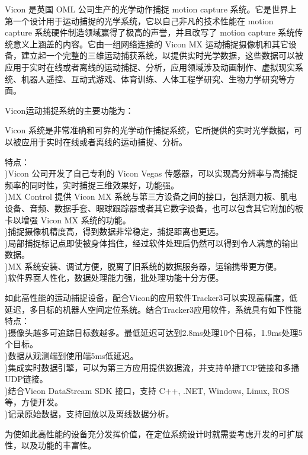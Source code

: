 Vicon 是英国 OML 公司生产的光学动作捕捉 motion capture 系统。它是世界上第一个设计用于运动捕捉的光学系统，它以自己非凡的技术性能在 motion capture 系统硬件制造领域赢得了极高的声誉，并且改写了 motion capture 系统传统意义上涵盖的内容。它由一组网络连接的 Vicon MX 运动捕捉摄像机和其它设备，建立起一个完整的三维运动捕获系统，以提供实时光学数据，这些数据可以被应用于实时在线或者离线的运动捕捉、分析，应用领域涉及动画制作、虚拟现实系统、机器人遥控、互动式游戏、体育训练、人体工程学研究、生物力学研究等方面。

Vicon运动捕捉系统的主要功能为：

Vicon 系统是非常准确和可靠的光学动作捕捉系统，它所提供的实时光学数据，可以被应用于实时在线或者离线的运动捕捉、分析。

特点：\\
)Vicon 公司开发了自己专利的 Vicon Vegas 传感器，可以实现高分辨率与高捕捉频率的同时性，实时捕捉三维效果好，功能强。\\
)MX Control 提供 Vicon MX 系统与第三方设备之间的接口，包括测力板、肌电设备、音频、数据手套、眼球跟踪器或者其它数字设备，也可以包含其它附加的板卡以增强 Vicon MX 系统的功能。\\
)捕捉摄像机精度高，得到数据非常稳定，捕捉距离也更远。\\
)局部捕捉标记点即使被身体挡住，经过软件处理后仍然可以得到令人满意的输出数据。\\
)MX 系统安装、调试方便，脱离了旧系统的数据服务器，运输携带更方便。\\
)软件界面人性化，数据处理能力强，批处理功能十分方便。

如此高性能的运动捕捉设备，配合Vicon的应用软件Tracker3可以实现高精度，低延迟，多目标的机器人空间定位系统。结合Tracker3应用软件，系统具有如下性能特点：\\
)摄像头越多可追踪目标数越多。最低延迟可达到2.8ms处理10个目标，1.9ms处理5个目标。\\
)数据从观测端到使用端5ms低延迟。\\
)集成实时数据引擎，可以为第三方应用提供数据流，并支持单播TCP链接和多播UDP链接。\\
)结合Vicon DataStream SDK 接口，支持 C++, .NET, Windows, Linux, ROS等，方便开发。\\
)记录原始数据，支持回放以及离线数据分析。

为使如此高性能的设备充分发挥价值，在定位系统设计时就需要考虑开发的可扩展性，以及功能的丰富性。

